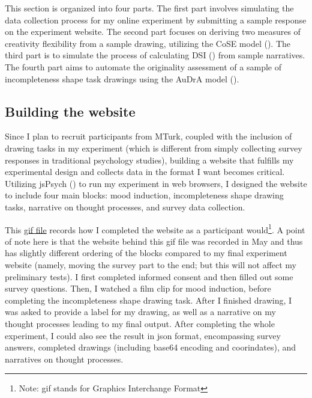 \documentclass[../Proposal_Writing_Sample.tex]{subfiles}
\begin{document}
This section is organized into four parts. The first part involves simulating the data collection process for my online experiment by submitting a sample response on the experiment website. The second part focuses on deriving two measures of creativity flexibility from a sample drawing, utilizing the CoSE model (\cite{aksan_cose_2021}). The third part is to simulate the process of calculating DSI (\cite{johnson_divergent_2022}) from sample narratives. The fourth part aims to automate the originality assessment of a sample of incompleteness shape task drawings using the AuDrA model (\cite{patterson_audra_2023}). 

\subsection*{Building the website}
Since I plan to recruit participants from MTurk, coupled with the inclusion of drawing tasks in my experiment (which is different from simply collecting survey responses in traditional psychology studies), building a website that fulfills my experimental design and collects data in the format I want becomes critical. Utilizing jsPsych (\cite{leeuw_jspsych_2023}) to run my experiment in web browsers, I designed the website to include four main blocks: mood induction, incompleteness shape drawing tasks, narrative on thought processes, and survey data collection. 

This \href{https://github.com/UC-MACS-30200/course-project-cty20010831/blob/main/sample_website_response_gif/sample_response.gif}{gif file} records how I completed the website as a participant would\footnote{Note: gif stands for Graphics Interchange Format}. A point of note here is that the website behind this gif file was recorded in May and thus has slightly different ordering of the blocks compared to my final experiment website (namely, moving the survey part to the end; but this will not affect my preliminary tests). I first completed informed consent and then filled out some survey questions. Then, I watched a film clip for mood induction, before completing the incompleteness shape drawing task. After I finished drawing, I was asked to provide a label for my drawing, as well as a narrative on my thought processes leading to my final output. After completing the whole experiment, I could also see the result in json format, encompassing survey answers, completed drawings (including base64 encoding and coorindates), and narratives on thought processes.
\end{document}
